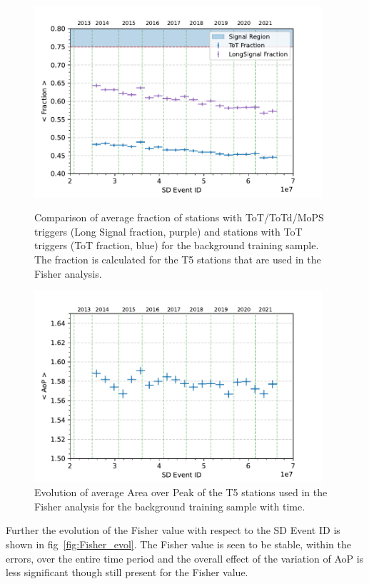 \begin{figure}[t!]
  \centering
  \includegraphics[width=0.95\textwidth]{thesis_figures/Nu_analysis/Time_evol/Selection_Evo_ToTFrac_LongSignal_wnt_redcut.pdf}
  \caption{Comparison of average fraction of stations with ToT/ToTd/MoPS triggers (Long Signal fraction, purple) and stations with ToT triggers (ToT fraction, blue) for the background training sample. The fraction is calculated for the T5 stations that are used in the Fisher analysis.}
  \label{fig:LongSig_evol}

  \includegraphics[width=0.95\textwidth]{thesis_figures/Nu_analysis/Time_evol/Selection_Evo_AoP_wnt_redcut.pdf}
  \caption{Evolution of average Area over Peak of the T5 stations used in the Fisher analysis for the background training sample with time.}
  \label{fig:AoP_evol}
\end{figure}

Further the evolution of the Fisher value with respect to the SD Event ID is shown in fig~\ref{fig:Fisher_evol}. The Fisher value is seen to be stable, within the errors, over the entire time period and the overall effect of the variation of AoP is less significant though still present for the Fisher value.


